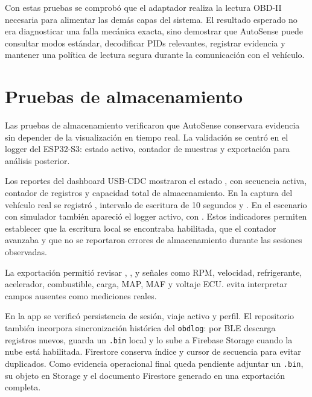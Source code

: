 \documentclass[12pt,letterpaper]{report}
\begin{document}
Con estas pruebas se comprobó que el adaptador realiza la lectura OBD-II necesaria para alimentar las demás capas del sistema. El resultado esperado no era diagnosticar una falla mecánica exacta, sino demostrar que AutoSense puede consultar modos estándar, decodificar PIDs relevantes, registrar evidencia y mantener una política de lectura segura durante la comunicación con el vehículo.

\section{Pruebas de almacenamiento}

Las pruebas de almacenamiento verificaron que AutoSense conservara evidencia sin depender de la visualización en tiempo real. La validación se centró en el logger del ESP32-S3: estado activo, contador de muestras y exportación para análisis posterior.

Los reportes del dashboard USB-CDC mostraron el estado , con secuencia activa, contador de registros y capacidad total de almacenamiento. En la captura del vehículo real se registró , intervalo de escritura de 10 segundos y . En el escenario con simulador también apareció el logger activo, con . Estos indicadores permiten establecer que la escritura local se encontraba habilitada, que el contador avanzaba y que no se reportaron errores de almacenamiento durante las sesiones observadas.

La exportación  permitió revisar , ,  y señales como RPM, velocidad, refrigerante, acelerador, combustible, carga, MAP, MAF y voltaje ECU.  evita interpretar campos ausentes como mediciones reales.

En la app se verificó persistencia de sesión, viaje activo y perfil. El repositorio también incorpora sincronización histórica del \texttt{obdlog}: por BLE descarga registros nuevos, guarda un \texttt{.bin} local y lo sube a Firebase Storage cuando la nube está habilitada. Firestore conserva índice y cursor de secuencia para evitar duplicados. Como evidencia operacional final queda pendiente adjuntar un \texttt{.bin}, su objeto en Storage y el documento Firestore generado en una exportación completa.
\end{document}
